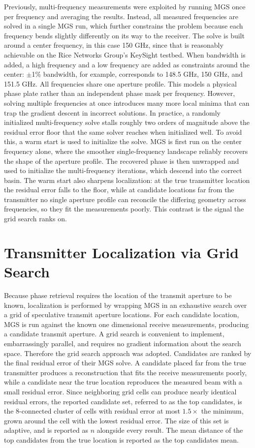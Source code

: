 \documentclass[11pt]{IEEEtran}
\begin{document}
Previously, multi-frequency measurements were exploited by running MGS once per frequency and averaging the results.
Instead, all measured frequencies are solved in a single MGS run, which further constrains the problem because each frequency bends slightly differently on its way to the receiver.
The solve is built around a center frequency, in this case 150 GHz, since that is reasonably achievable on the Rice Networks Group's KeySight testbed.
When bandwidth is added, a high frequency and a low frequency are added as constraints around the center: \(\pm\)1\% bandwidth, for example, corresponds to 148.5 GHz, 150 GHz, and 151.5 GHz.
All frequencies share one aperture profile.
This models a physical phase plate rather than an independent phase mask per frequency.
However, solving multiple frequencies at once introduces many more local minima that can trap the gradient descent in incorrect solutions.
In practice, a randomly initialized multi-frequency solve stalls roughly two orders of magnitude above the residual error floor that the same solver reaches when initialized well.
To avoid this, a warm start is used to initialize the solve.
MGS is first run on the center frequency alone, where the smoother single-frequency landscape reliably recovers the shape of the aperture profile.
The recovered phase is then unwrapped and used to initialize the multi-frequency iterations, which descend into the correct basin.
The warm start also sharpens localization: at the true transmitter location the residual error falls to the floor, while at candidate locations far from the transmitter no single aperture profile can reconcile the differing geometry across frequencies, so they fit the measurements poorly.
This contrast is the signal the grid search ranks on.

\section{Transmitter Localization via Grid Search}

Because phase retrieval requires the location of the transmit aperture to be known, localization is performed by wrapping MGS in an exhaustive search over a grid of speculative transmit aperture locations.
For each candidate location, MGS is run against the known one dimensional receive measurements, producing a candidate transmit aperture.
A grid search is convenient to implement, embarrassingly parallel, and requires no gradient information about the search space.
Therefore the grid search approach was adopted.
Candidates are ranked by the final residual error of their MGS solve.
A candidate placed far from the true transmitter produces a reconstruction that fits the receive measurements poorly, while a candidate near the true location reproduces the measured beam with a small residual error.
Since neighboring grid cells can produce nearly identical residual errors, the reported candidate set, referred to as the top candidates, is the 8-connected cluster of cells with residual error at most \(1.5\times\) the minimum, grown around the cell with the lowest residual error.
The size of this set is adaptive, and is reported as \(n\) alongside every result.
The mean distance of the top candidates from the true location is reported as the top candidates mean.
\end{document}
